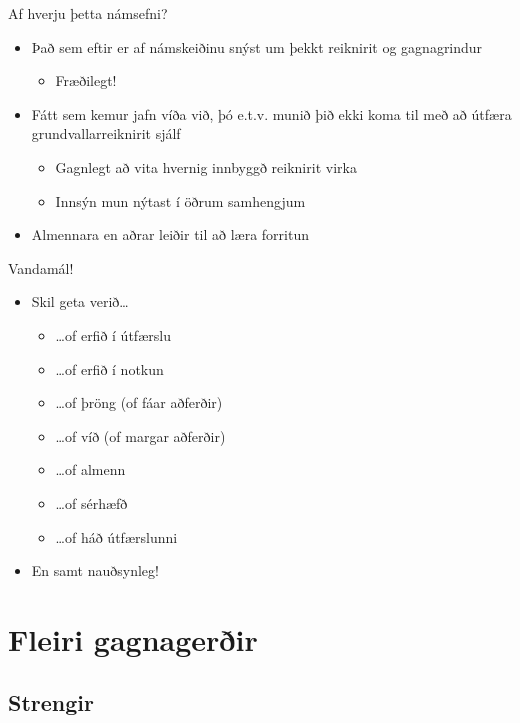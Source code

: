 \begin{frame}{Af hverju þetta námsefni?}
	\begin{itemize}
		\item Það sem eftir er af námskeiðinu snýst um þekkt reiknirit  og gagnagrindur 
		      \begin{itemize}
			      \item Fræðilegt!
		      \end{itemize}
		\item Fátt sem kemur jafn víða við, þó e.t.v. munið þið ekki koma til með að útfæra grundvallarreiknirit sjálf
		      \begin{itemize}
			      \item Gagnlegt að vita hvernig innbyggð reiknirit virka
			      \item Innsýn mun nýtast í öðrum samhengjum
		      \end{itemize}
		\item Almennara en aðrar leiðir til að læra forritun
	\end{itemize}
\end{frame}

\begin{frame}{Vandamál!}
	\begin{itemize}
		\item Skil geta verið\ldots
		      \begin{itemize}
			      \item \ldots of erfið í útfærslu
			      \item \ldots of erfið í notkun
			      \item \ldots of þröng (of fáar aðferðir)
			      \item \ldots of víð (of margar aðferðir)
			      \item \ldots of almenn
			      \item \ldots of sérhæfð
			      \item \ldots of háð útfærslunni
		      \end{itemize}
		\item En samt nauðsynleg!
	\end{itemize}
\end{frame}

\section{Fleiri gagnagerðir}

\subsection{Strengir}

